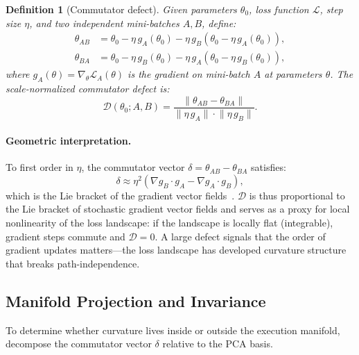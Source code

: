 \documentclass[11pt]{article}
\newcommand{\norm}[1]{\lVert #1 \rVert}
\newcommand{\defect}{\mathcal{D}}
\newtheorem{definition}{Definition}
\begin{document}
\begin{definition}[Commutator defect]
\label{def:commutator}
Given parameters $\theta_0$, loss function $\mathcal{L}$, step size $\eta$, and two independent mini-batches $A, B$, define:
\begin{align}
  \theta_{AB} &= \theta_0 - \eta\, g_A(\theta_0) - \eta\, g_B(\theta_0 - \eta\, g_A(\theta_0)), \label{eq:theta_AB}\\
  \theta_{BA} &= \theta_0 - \eta\, g_B(\theta_0) - \eta\, g_A(\theta_0 - \eta\, g_B(\theta_0)), \label{eq:theta_BA}
\end{align}
where $g_A(\theta) = \nabla_\theta \mathcal{L}_A(\theta)$ is the gradient on mini-batch $A$ at parameters $\theta$. The \emph{scale-normalized commutator defect} is:
\begin{equation}
  \defect(\theta_0; A, B) = \frac{\norm{\theta_{AB} - \theta_{BA}}}{\norm{\eta\, g_A} \cdot \norm{\eta\, g_B}}.
  \label{eq:defect}
\end{equation}
\end{definition}

\paragraph{Geometric interpretation.} To first order in $\eta$, the commutator vector $\delta = \theta_{AB} - \theta_{BA}$ satisfies:
\begin{equation}
  \delta \approx \eta^2 (\nabla g_B \cdot g_A - \nabla g_A \cdot g_B),
  \label{eq:lie_bracket}
\end{equation}
which is the Lie bracket of the gradient vector fields~\citep{xu2026integrability}. $\defect$ is thus proportional to the Lie bracket of stochastic gradient vector fields and serves as a proxy for local nonlinearity of the loss landscape: if the landscape is locally flat (integrable), gradient steps commute and $\defect = 0$. A large defect signals that the order of gradient updates matters---the loss landscape has developed curvature structure that breaks path-independence.

\subsection{Manifold Projection and Invariance}
\label{sec:invariance_def}

To determine whether curvature lives inside or outside the execution manifold, \citet{xu2026integrability} decompose the commutator vector $\delta$ relative to the PCA basis.
\end{document}

